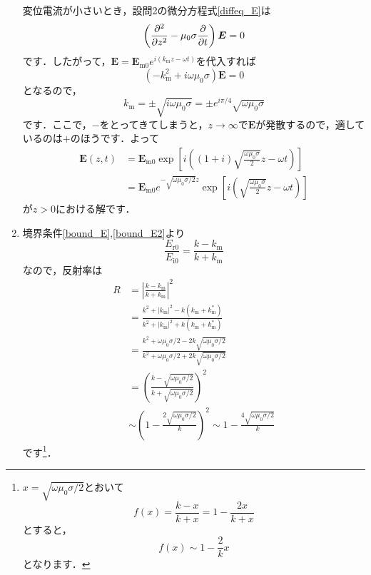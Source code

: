 \documentclass[a4paper,pdflatex,ja=standard]{bxjsarticle}
\begin{document}
\begin{enumerate}
  変位電流が小さいとき，設問2の微分方程式\eqref{diffeq_E}は
  \begin{equation}
    \left(  
      \pdv[2]{}{z}
      -
      \mu_0\sigma
      \pdv{}{t} 
    \right)
    \bm{E}
    =
    0
  \end{equation}
  です．したがって，$\bm{E}=\bm{E}_{\mathrm{m}0}e^{i(k_{\mathrm{m}}z-\omega t)}$を代入すれば
  \begin{equation}
    \left(  
      -k_{\mathrm{m}}^2
      +i\omega\mu_0\sigma
    \right)
    \bm{E}
    =
    0    
  \end{equation}
  となるので，
  \begin{equation}
    k_{\mathrm{m}}
    =
    \pm \sqrt{i\omega\mu_0\sigma}
    =
    \pm e^{i\pi/4}\sqrt{\omega\mu_0\sigma}
  \end{equation}
  です．ここで，$-$をとってきてしまうと，$z\rightarrow\infty$で$\bm{E}$が発散するので，適しているのは$+$のほうです．よって
  \begin{align}
    \bm{E}(z,t)
    &=
    \bm{E}_{\mathrm{m}0}\exp
    \left[  
      i\left(  
        (1+i)\sqrt{\frac{\omega\mu_0\sigma}{2}}z
        -
        \omega t
      \right)
    \right]
    \nonumber
    \\
    &=
    \bm{E}_{\mathrm{m}0}
    e^{-\sqrt{\omega\mu_0\sigma/2}z}
    \exp
    \left[  
      i\left(  
        \sqrt{\frac{\omega\mu_0\sigma}{2}}z
        -
        \omega t
      \right)
    \right]    
  \end{align}
  が$z>0$における解です．


  \item 

  境界条件\eqref{bound_E},\eqref{bound_E2}より
  \begin{equation}
    \frac{
      E_{\mathrm{r}0}
    }{
      E_{\mathrm{i}0}
    }
    =
    \frac{k-k_{\mathrm{m}}}{k+k_{\mathrm{m}}}
  \end{equation}
  なので，反射率は
  \begin{align}
    R
    &=
    \left|
      \frac{k-k_{\mathrm{m}}}{k+k_{\mathrm{m}}}
    \right|^2
    \nonumber
    \\
    &=
    \frac{k^2+|k_{\mathrm{m}}|^2-k(k_{\mathrm{m}}+k_{\mathrm{m}}^{*})}{k^2+|k_{\mathrm{m}}|^2+k(k_{\mathrm{m}}+k_{\mathrm{m}}^{*})}
    \nonumber
    \\
    &=
    \frac{
      k^2+\omega\mu_0\sigma/2-2k\sqrt{\omega\mu_0\sigma/2}
    }{
      k^2+\omega\mu_0\sigma/2+2k\sqrt{\omega\mu_0\sigma/2}
    }
    \nonumber
    \\
    &=
    \left(  
      \frac{k-\sqrt{\omega\mu_0\sigma/2}}{k+\sqrt{\omega\mu_0\sigma/2}}
    \right)^2
    \nonumber
    \\
    &\sim
    \left(  
      1-\frac{2\sqrt{\omega\mu_0\sigma/2}}{k}
    \right)^2
    \sim
    1-\frac{4\sqrt{\omega\mu_0\sigma/2}}{k}
  \end{align}
  です\footnote{
    $x=\sqrt{\omega\mu_0\sigma/2}$とおいて
    $$
      f(x)=\frac{k-x}{k+x}=1-\frac{2x}{k+x}
    $$
    とすると，
    $$
      f(x)\sim 1-\frac{2}{k}x
    $$
    となります．
  }．



\end{enumerate}
\end{document}
